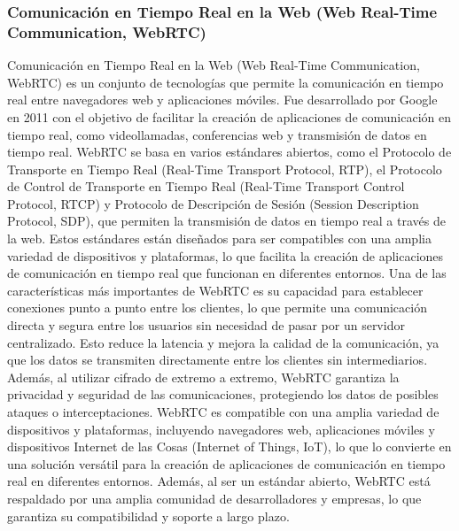 \subsubsection{Comunicaci\'on en Tiempo Real en la Web (Web Real-Time Communication, WebRTC)} %
\label{ssub:WebRTC}

    Comunicaci\'on en Tiempo Real en la Web (Web Real-Time Communication, WebRTC) es un conjunto de tecnolog\'ias que permite la comunicaci\'on en tiempo real entre navegadores web 
        y aplicaciones m\'oviles. Fue desarrollado por Google en 2011 con el objetivo de facilitar la creaci\'on de aplicaciones de 
        comunicaci\'on en tiempo real, como videollamadas, conferencias web y transmisi\'on de datos en tiempo real. \cite{WebRTC}
    \vskip 0.5cm
        WebRTC se basa en varios est\'andares abiertos, como el Protocolo de Transporte en Tiempo Real (Real-Time Transport Protocol, RTP), 
            el Protocolo de Control de Transporte en Tiempo Real (Real-Time Transport Control Protocol, RTCP) y 
            Protocolo de Descripci\'on de Sesi\'on (Session Description Protocol, SDP), que permiten la transmisi\'on 
            de datos en tiempo real a trav\'es de la web. Estos est\'andares est\'an dise\~nados para ser compatibles con una amplia 
            variedad de dispositivos y plataformas, lo que facilita la creaci\'on de aplicaciones de comunicaci\'on en tiempo real 
            que funcionan en diferentes entornos. \cite{WebRTC}
    \vskip 0.5cm
        Una de las caracter\'isticas m\'as importantes de WebRTC es su capacidad para establecer conexiones punto a punto entre 
            los clientes, lo que permite una comunicaci\'on directa y segura entre los usuarios sin necesidad de pasar por un 
            servidor centralizado. Esto reduce la latencia y mejora la calidad de la comunicaci\'on, ya que los datos se transmiten 
            directamente entre los clientes sin intermediarios. Adem\'as, al utilizar cifrado de extremo a extremo, WebRTC garantiza 
            la privacidad y seguridad de las comunicaciones, protegiendo los datos de posibles ataques o interceptaciones. \cite{WebRTC}
    \vskip 0.5cm
        WebRTC es compatible con una amplia variedad de dispositivos y plataformas, incluyendo navegadores web, aplicaciones m\'oviles 
            y dispositivos Internet de las Cosas (Internet of Things, IoT), lo que lo convierte en una soluci\'on vers\'atil para la creaci\'on de aplicaciones 
            de comunicaci\'on en tiempo real en diferentes entornos. Adem\'as, al ser un est\'andar abierto, WebRTC est\'a respaldado por 
            una amplia comunidad de desarrolladores y empresas, lo que garantiza su compatibilidad y soporte a largo plazo. \cite{WebRTC}

